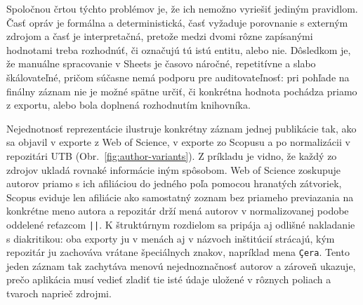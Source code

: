 Spoločnou črtou týchto problémov je, že ich nemožno vyriešiť jediným pravidlom. Časť opráv je formálna a deterministická, časť vyžaduje porovnanie s externým zdrojom a časť je interpretačná, pretože medzi dvomi rôzne zapísanými hodnotami treba rozhodnúť, či označujú tú istú entitu, alebo nie. Dôsledkom je, že manuálne spracovanie v Sheets je časovo náročné, repetitívne a slabo škálovateľné, pričom súčasne nemá podporu pre auditovateľnosť: pri pohľade na finálny záznam nie je možné spätne určiť, či konkrétna hodnota pochádza priamo z exportu, alebo bola doplnená rozhodnutím knihovníka.

Nejednotnosť reprezentácie ilustruje konkrétny záznam jednej publikácie tak, ako sa objavil v exporte z Web of Science, v exporte zo Scopusu a po normalizácii v repozitári UTB (Obr.~\ref{fig:author-variants}). Z príkladu je vidno, že každý zo zdrojov ukladá rovnaké informácie iným spôsobom. Web of Science zoskupuje autorov priamo s ich afiliáciou do jedného poľa pomocou hranatých zátvoriek, Scopus eviduje len afiliácie ako samostatný zoznam bez priameho previazania na konkrétne meno autora a repozitár drží mená autorov v normalizovanej podobe oddelené reťazcom \texttt{||}. K štruktúrnym rozdielom sa pripája aj odlišné nakladanie s diakritikou: oba exporty ju v menách aj v názvoch inštitúcií strácajú, kým repozitár ju zachováva vrátane špeciálnych znakov, napríklad mena \texttt{Çera}. Tento jeden záznam tak zachytáva menovú nejednoznačnosť autorov a zároveň ukazuje, prečo aplikácia musí vedieť zladiť tie isté údaje uložené v rôznych poliach a tvaroch naprieč zdrojmi.

